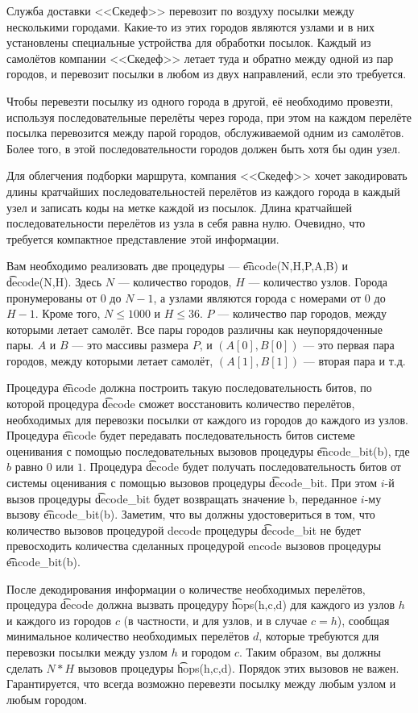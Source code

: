 Служба доставки <<Скедеф>> перевозит по воздуху посылки между несколькими городами. Какие-то из этих городов являются узлами и в них установлены специальные устройства для обработки посылок. Каждый из самолётов компании <<Скедеф>> летает туда и обратно между одной из пар городов, и перевозит посылки в любом из двух направлений, если это требуется.  

Чтобы перевезти посылку из одного города в другой, её необходимо провезти, используя последовательные перелёты через города, при этом на каждом перелёте посылка перевозится между парой городов, обслуживаемой одним из самолётов. Более того, в этой последовательности городов должен быть хотя бы один узел.

Для облегчения подборки маршрута, компания <<Скедеф>> хочет закодировать длины кратчайших последовательностей перелётов из каждого города в каждый узел и записать коды на метке каждой из посылок. Длина кратчайшей последовательности перелётов из узла в себя равна нулю. Очевидно, что требуется компактное представление этой информации.

Вам необходимо реализовать две процедуры --- \t{encode(N,H,P,A,B)} и \t{decode(N,H)}. Здесь $N$ --- количество городов, $H$ --- количество узлов. Города пронумерованы от $0$ до $N-1$, а узлами являются города с номерами от $0$ до $H-1$. Кроме того, $N \le 1000$ и $H \le 36$. $P$ --- количество пар городов, между которыми летает самолёт. Все пары городов различны как неупорядоченные пары. $A$ и $B$ --- это массивы размера $P$, и $(A[0], B[0])$ --- это первая пара городов, между которыми летает самолёт, $(A[1], B[1])$ --- вторая пара и т.д. 

Процедура \t{encode} должна построить такую последовательность битов, по которой
процедура \t{decode} сможет восстановить количество перелётов, необходимых для
перевозки посылки от каждого из городов до каждого из узлов. Процедура \t{encode} будет
передавать последовательность битов системе оценивания с помощью последовательных
вызовов процедуры \t{encode\_bit(b)}, где $b$ равно $0$ или $1$. Процедура \t{decode} будет получать последовательность битов от системы оценивания с помощью вызовов процедуры \t{decode\_bit}. При этом $i$-й вызов процедуры \t{decode\_bit} будет возвращать значение b, переданное $i$-му вызову \t{encode\_bit(b)}. Заметим, что вы должны удостовериться в том, что количество вызовов процедурой decode процедуры \t{decode\_bit} не будет 
превосходить количества сделанных процедурой encode вызовов процедуры \t{encode\_bit(b)}.

После декодирования информации о количестве необходимых перелётов, процедура
\t{decode} должна вызвать процедуру \t{hops(h,c,d)} для каждого из узлов $h$ и каждого из 
городов $c$ (в частности, и для узлов, и в случае $c=h$), сообщая минимальное количество
необходимых перелётов $d$, которые требуются для перевозки посылки между узлом $h$ и
городом $c$. Таким образом, вы должны сделать $N*H$ вызовов процедуры \t{hops(h,c,d)}.
Порядок этих вызовов не важен. Гарантируется, что всегда возможно перевезти посылку
между любым узлом и любым городом.

